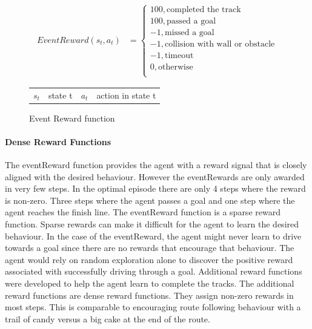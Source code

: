\begin{figure}
    \centering
    \begin{align}
        EventReward(s_t, a_t) & = \begin{cases}
                                      100,           \text{completed the track}           \\
                                      100,           \text{passed a goal}                 \\
                                      -1,            \text{missed a goal}                   \\
                                      -1,            \text{collision with wall or obstacle} \\
                                      -1,            \text{timeout}                         \\
                                      0,             \text{otherwise}                       \\
                                  \end{cases} \nonumber
    \end{align}
    \caption{Event Reward function}
    \begin{tabular}{r@{: }l r@{: }l}
        $s_t$ & state t & $a_t$ & action in state t
    \end{tabular}
    \label{fig:eventReward_function}
\end{figure}


\paragraph*{Dense Reward Functions}
The eventReward function provides the agent with a reward signal that is closely aligned with the desired behaviour. However the eventRewards are only awarded in very few steps. In the optimal episode there are only 4 steps where the reward is non-zero. Three steps where the agent passes a goal and one step where the agent reaches the finish line. The eventReward function is a sparse reward function. Sparse rewards can make it difficult for the agent to learn the desired behaviour. In the case of the eventReward, the agent might never learn to drive towards a goal since there are no rewards that encourage that behaviour. The agent would rely on random exploration alone to discover the positive reward associated with successfully driving through a goal.
Additional reward functions were developed to help the agent learn to complete the tracks. The additional reward functions are dense reward functions. They assign non-zero rewards in most steps. This is comparable to encouraging route following behaviour with a trail of candy versus a big cake at the end of the route.


